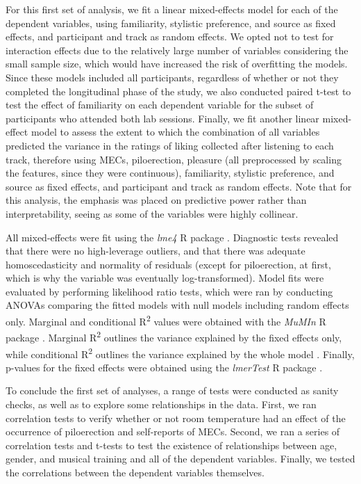 For this first set of analysis, we fit a linear mixed-effects model for each of the dependent variables, using familiarity, stylistic preference, and source as fixed effects, and participant and track as random effects. We opted not to test for interaction effects due to the relatively large number of variables considering the small sample size, which would have increased the risk of overfitting the models. Since these models included all participants, regardless of whether or not they completed the longitudinal phase of the study, we also conducted paired t-test to test the effect of familiarity on each dependent variable for the subset of participants who attended both lab sessions. Finally, we fit another linear mixed-effect model to assess the extent to which the combination of all variables predicted the variance in the ratings of liking collected after listening to each track, therefore using MECs, piloerection, pleasure (all preprocessed by scaling the features, since they were continuous), familiarity, stylistic preference, and source as fixed effects, and participant and track as random effects. Note that for this analysis, the emphasis was placed on predictive power rather than interpretability, seeing as some of the variables were highly collinear.

All mixed-effects were fit using the \emph{lme4} R package \parencite{bates2015}. Diagnostic tests revealed that there were no high-leverage outliers, and that there was adequate homoscedasticity and normality of residuals (except for piloerection, at first, which is why the variable was eventually log-transformed). Model fits were evaluated by performing likelihood ratio tests, which were ran by conducting ANOVAs comparing the fitted models with null models including random effects only. Marginal and conditional R\textsuperscript{2} values were obtained with the \emph{MuMIn} R package \parencite{barton2020}. Marginal R\textsuperscript{2} outlines the variance explained by the fixed effects only, while conditional R\textsuperscript{2} outlines the variance explained by the whole model \parencite{nakagawa2013}. Finally, p-values for the fixed effects were obtained using the \emph{lmerTest} R package \parencite{kuznetsova2017}.

To conclude the first set of analyses, a range of tests were conducted as sanity checks, as well as to explore some relationships in the data. First, we ran correlation tests to verify whether or not room temperature had an effect of the occurrence of piloerection and self-reports of MECs. Second, we ran a series of correlation tests and t-tests to test the existence of relationships between age, gender, and musical training and all of the dependent variables. Finally, we tested the correlations between the dependent variables themselves.

